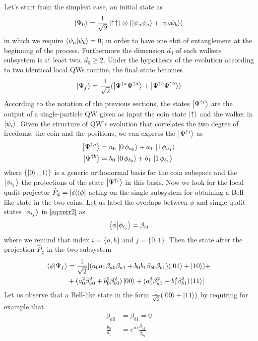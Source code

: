 \documentclass[
	aps, pra, authorblock, superscriptaddress, twocolumn,
	10pt
]{revtex4-1}
\begin{document}
Let's start from the simplest case, an initial state as
\begin{equation}
    \ket{\Psi_0}=\frac{1}{\sqrt{2}}\ket{\uparrow\uparrow}\otimes
    ( \ket{\psi_a\psi_a}+\ket{\psi_b\psi_b})
\end{equation}
in which we require $\braket{\psi_a}{\psi_b}=0$, in order to have one ebit of entanglement at the beginning of the process. Furthermore the dimension $d_0$ of each walkers subsystem is at least two, $d_0\geq 2$. Under the hypothesis of the evolution according to two identical local QWs routine, the final state becomes
\begin{equation}
    \ket{\Psi_f}=\frac{1}{\sqrt{2}}(\ket{\Psi^{\uparrow a}\Psi^{\uparrow a}}+\ket{\Psi^{\uparrow b}\Psi^{\uparrow b}})
    \label{eq:retr1}
\end{equation}
According to the notation of the previous sections, the states $\ket{\Psi^{\uparrow i}}$ are the output of a single-particle QW given as input the coin state $\ket{\uparrow}$ and the walker in $\ket{\psi_i}$. Given the structure of QW's evolution that correlates the two degree of freedoms, the coin and the positions, we can express the $\ket{\Psi^{\uparrow i}}$ as
\begin{align}
    \ket{\Psi^{\uparrow a}}&= a_0\,\ket{0\,\phi_{a_0}} +a_1\,\ket{1\,\phi_{a_1}} \notag\\
    \ket{\Psi^{\uparrow b}}&= b_0\,\ket{0\,\phi_{b_0}} +b_1\,\ket{1\,\phi_{b_1}}
    \label{eq:retr2}
\end{align}
where $\{\ket{0},\ket{1}\}$ is a generic orthonormal basis for the coin subspace and the $\ket{\phi_{i_j}}$ the projections of the state $\ket{\Psi^{\uparrow i}}$ in this basis. 
Now we look for the local qudit projector $\hat{P}_{\phi}=\ketbra{\phi}$ acting on the single subsystem for obtaining a Bell-like state in the two coins. Let us label the overlaps between $\phi$ and single qudit states $\ket{\phi_{i_j}}$ in \eqref{eq:retr2} as
\begin{equation}
    \braket{\phi}{\phi_{i_j}}=\beta_{ij}
\end{equation}
where we remind that index $i=\{a,b\}$ and $j=\{0,1\}$. Then the state after the projection $\hat{P}_{\phi}$ in the two subsystem
\begin{equation}
\begin{split}
    \braket{\phi}{\Psi_f}&=\frac{1}{\sqrt{2}}[(a_0a_1\beta_{a0}\beta_{a1}
    + b_0b_1 \beta_{b0}\beta_{b1})(\ket{01}+\ket{10})+\\
    &+(a_0^2\beta_{a0}^2+b_0^2\beta_{b0}^2)\ket{00}+ (a_1^2\beta_{a1}^2+b_1^2\beta_{b1}^2)\ket{11}]
\end{split}
\end{equation}
Let us observe that a Bell-like state in the form $\frac{1}{\sqrt{2}}(\ket{00}+\ket{11})$ by requiring for example that 
\begin{align}
\beta_{a0}&=\beta_{b1}=0 \\
\frac{b_0}{a_1}&= e^{i \alpha} \frac{\beta_{a1}}{\beta_{b_0}}
\end{align}
\end{document}
